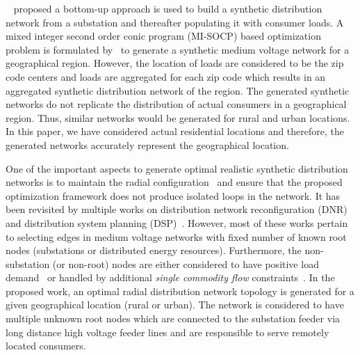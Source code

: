 \documentclass[sigconf]{acmart}
\begin{document}
~\cite{gm2016} proposed a bottom-up approach is used to build a synthetic distribution network from a substation and thereafter populating it with consumer loads. A mixed integer second order conic program (MI-SOCP) based optimization problem is formulated by~\cite{trpovski_2018} to generate a synthetic medium voltage network for a geographical region. However, the location of loads are considered to be the zip code centers and loads are aggregated for each zip code which results in an aggregated synthetic distribution network of the region. The generated synthetic networks do not replicate the distribution of actual consumers in a geographical region. Thus, similar networks would be generated for rural and urban locations. In this paper, we have considered actual residential locations and therefore, the generated networks accurately represent the geographical location.

One of the important aspects to generate optimal realistic synthetic distribution networks is to maintain the radial configuration~\cite{lei2019radiality} and ensure that the proposed optimization framework does not produce isolated loops in the network. It has been revisited by multiple works on distribution network reconfiguration (DNR)~\cite{manish2018OptimalDS,manish2019,dist_recon_2012} and distribution system planning (DSP)~\cite{radiality_2012,radiality_1987,wang2019radial}. However, most of these works pertain to selecting edges in medium voltage networks with fixed number of known root nodes (substations or distributed energy resources). Furthermore, the non-substation (or non-root) nodes are either considered to have positive load demand~\cite{dist_recon_2012,radiality_2012,radiality_1987} or handled by additional \emph{single commodity flow} constraints~\cite{manish2019,wang2019radial}. In the proposed work, an optimal radial distribution network topology is generated for a given geographical location (rural or urban). The network is considered to have multiple unknown root nodes which are connected to the substation feeder via long distance high voltage feeder lines and are responsible to serve remotely located consumers.
\end{document}
